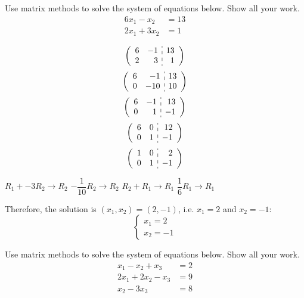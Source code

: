 \documentclass[11pt,letterpaper]{article}
\begin{document}
 Use matrix methods to solve the system of equations below. Show all your work. 
	\[
	\begin{aligned}
	6x_1 - x_2&= 13 \\
	2x_1 + 3x_2&= 1
	\end{aligned}
	\] \pspace

\sol \pspace
\begin{minipage}[t]{0.49\textwidth}
	\[
	\left(
	\begin{array}{rr:r}
	6 & -1 & 13 \\
	2 & 3 & 1
	\end{array} 
	\right)
	\] \pspace
	\[
	\left(
	\begin{array}{rr:r}
	6 & -1 & 13 \\
	0 & -10 & 10
	\end{array} 
	\right)
	\] \pspace
	\[
	\left(
	\begin{array}{rr:r}
	6 & -1 & 13 \\
	0 & 1 & -1
	\end{array} 
	\right)
	\] \pspace
	\[
	\left(
	\begin{array}{rr:r}
	6 & 0 & 12 \\
	0 & 1 & -1
	\end{array} 
	\right)
	\] \pspace
	\[
	\left(
	\begin{array}{rr:r}
	1 & 0 & 2 \\
	0 & 1 & -1
	\end{array} 
	\right)
	\]
\end{minipage}%
\begin{minipage}[t]{0.49\textwidth}
\pvspace{0.5cm}
$R_1 + -3R_2 \to R_2$ \pvspace{1.1cm}
$-\dfrac{1}{10} R_2 \to R_2$ \pvspace{1.1cm}
$R_2 + R_1 \to R_1$ \pvspace{1.1cm}
$\dfrac{1}{6} R_1 \to R_1$
\end{minipage} \pspace

Therefore, the solution is $(x_1, x_2)= (2, -1)$, i.e. $x_1= 2$ and $x_2= -1$:
	\[
	\begin{cases}
	x_1= 2 \\
	x_2= -1
	\end{cases}
	\]



\newpage




 Use matrix methods to solve the system of equations below. Show all your work. 
	\[
	\begin{aligned}
	x_1 - x_2 + x_3&= 2 \\
	2x_1 + 2x_2 - x_3&= 9 \\
	x_2 - 3x_3&= 8
	\end{aligned}
	\]
\end{document}
